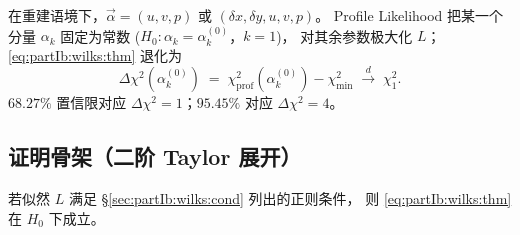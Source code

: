 在重建语境下，$\vec{\alpha}=(u,v,p)$ 或 $(\delta x,\delta y,u,v,p)$。
Profile Likelihood 把某一个分量 $\alpha_k$ 固定为常数
($H_0:\alpha_k = \alpha_k^{(0)}$，$k=1$)，
对其余参数极大化 $L$；
\eqref{eq:partIb:wilks:thm} 退化为
\begin{equation}
  \Delta\chi^2(\alpha_k^{(0)})
  \;=\;
  \chi^2_{\mathrm{prof}}(\alpha_k^{(0)})-\chi^2_{\min}
  \;\xrightarrow{d}\;\chi^2_{1}.
  \label{eq:partIb:wilks:profile}
\end{equation}
$68.27\%$ 置信限对应 $\Delta\chi^2 = 1$；$95.45\%$ 对应 $\Delta\chi^2 = 4$。

\subsection{证明骨架（二阶 Taylor 展开）}
\label{sec:partIb:wilks:proof}

\begin{theorem}
\label{thm:partIb:wilks}
若似然 $L$ 满足 §\ref{sec:partIb:wilks:cond} 列出的正则条件，
则 \eqref{eq:partIb:wilks:thm} 在 $H_0$ 下成立。
\end{theorem}


